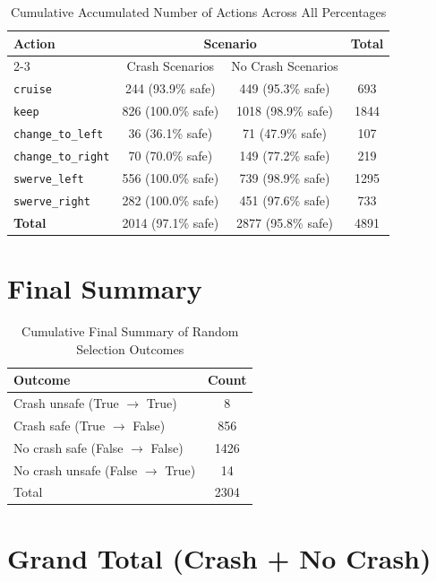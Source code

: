 \documentclass{article}
\begin{document}
\begin{table}[h]
\centering
\caption{Cumulative Accumulated Number of Actions Across All Percentages}
\begin{tabular}{l|cc|c}
\toprule
\multirow{2}{*}{Action} & \multicolumn{2}{c|}{Scenario} & \multirow{2}{*}{Total} \\
\cmidrule{2-3}
 & Crash Scenarios & No Crash Scenarios \\
\midrule
\texttt{cruise} & 244 (93.9\% safe) & 449 (95.3\% safe) & 693 \\ 
\texttt{keep} & 826 (100.0\% safe) & 1018 (98.9\% safe) & 1844 \\ 
\texttt{change\_to\_left} & 36 (36.1\% safe) & 71 (47.9\% safe) & 107 \\ 
\texttt{change\_to\_right} & 70 (70.0\% safe) & 149 (77.2\% safe) & 219 \\ 
\texttt{swerve\_left} & 556 (100.0\% safe) & 739 (98.9\% safe) & 1295 \\ 
\texttt{swerve\_right} & 282 (100.0\% safe) & 451 (97.6\% safe) & 733 \\ 
\midrule
\textbf{Total} & 2014 (97.1\% safe) & 2877 (95.8\% safe) & 4891 \\ 
\bottomrule
\end{tabular}
\end{table}

\section{Final Summary}

\begin{table}[h]
\centering
\caption{Cumulative Final Summary of Random Selection Outcomes}
\begin{tabular}{lc}
\toprule
Outcome & Count \\
\midrule
Crash unsafe (True $\rightarrow$ True) & 8 \\ 
Crash safe (True $\rightarrow$ False) & 856 \\ 
No crash safe (False $\rightarrow$ False) & 1426 \\ 
No crash unsafe (False $\rightarrow$ True) & 14 \\ 
\midrule
Total & 2304 \\ 
\bottomrule
\end{tabular}
\end{table}

\section{Grand Total (Crash + No Crash)}
\end{document}
